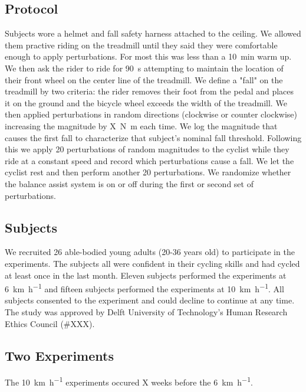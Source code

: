 \documentclass{article}
\begin{document}
\subsection{Protocol}
%
Subjects wore a helmet and fall safety harness attached to the ceiling. We
allowed them practive riding on the treadmill until they said they were
comfortable enough to apply perturbations. For most this was less than a
10~\si{\minute} warm up. We then ask the rider to ride for 90~\si{\second}
attempting to maintain the location of their front wheel on the center line of
the treadmill. We define a "fall" on the treadmill by two criteria: the rider
removes their foot from the pedal and places it on the ground and the bicycle
wheel exceeds the width of the treadmill. We then applied perturbations in
random directions (clockwise or counter clockwise) increasing the magnitude by
X~\si{\newton\meter} each time. We log the magnitude that causes the first fall
to characterize that subject's nominal fall threshold. Following this we apply
20 perturbations of random magnitudes to the cyclist while they ride at a
constant speed and record which perturbations cause a fall. We let the cyclist
rest and then perform another 20 perturbations. We randomize whether the
balance assist system is on or off during the first or second set of
perturbations.

\subsection{Subjects}
%
We recruited 26 able-bodied young adults (20-36 years old) to participate in
the experiments. The subjects all were confident in their cycling skills and
had cycled at least once in the last month. Eleven subjects performed the
experiments at 6~\si{\kilo\meter\per\hour} and fifteen subjects performed the
experiments at 10~\si{\kilo\meter\per\hour}. All subjects consented to the
experiment and could decline to continue at any time.  The study was approved
by Delft University of Technology's Human Research Ethics Council (#XXX).

\subsection{Two Experiments}
%
The 10~\si{\kilo\meter\per\hour} experiments occured X weeks before the
6~\si{\kilo\meter\per\hour}.
\end{document}
